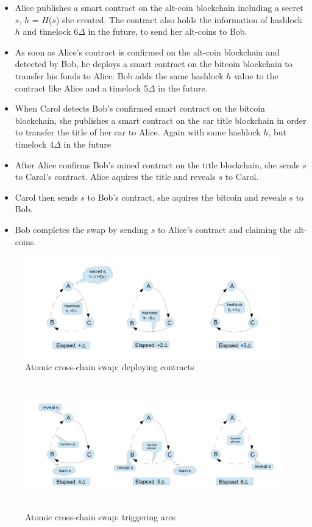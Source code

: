 \begin{itemize}
	\item Alice publishes a smart contract on the alt-coin blockchain including a secret $s$, $h$ = $H$($s$) she created. The contract also holds the information of hashlock $h$ and timelock 6$\Delta$ in the future, to send her alt-coins to Bob.
	\item As soon as Alice's contract is confirmed on the alt-coin blockchain and detected by Bob, he deploys a smart contract on the bitcoin blockchain to transfer his funds to Alice. Bob adds the same hashlock $h$ value to the contract like Alice and a timelock 5$\Delta$ in the future.
	\item When Carol detects Bob's confirmed smart contract on the bitcoin blockchain, she publishes a smart contract on the car title blockchain in order to transfer the title of her car to Alice. Again with same hashlock $h$, but timelock 4$\Delta$ in the future
	\item After Alice confirms Bob's mined contract on the title blockchain, she sends $s$ to Carol's contract. Alice aquires the title and reveals $s$ to Carol.
	\item Carol then sends $s$ to Bob's contract, she aquires the bitcoin and reveals $s$ to Bob.
	\item Bob completes the swap by sending $s$ to Alice's contract and claiming the alt-coins.
\end{itemize}

\begin{figure}[h]
	\includegraphics[width=16cm]{deploying_contracts}	%
	\caption{Atomic cross-chain swap: deploying contracts}
	\label{fig:deploying_contracts}
\end{figure}

\clearpage

\begin{figure}[h]
	\includegraphics[height=5.5cm]{triggering_arcs}	%
	\caption{Atomic cross-chain swap: triggering arcs}
	\label{fig:triggering_arcs}
\end{figure}


